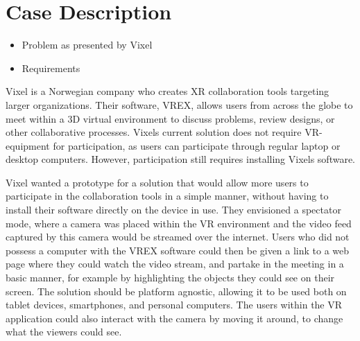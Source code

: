 \section{Case Description}
\begin{itemize}
    \item Problem as presented by Vixel
    \item Requirements 
\end{itemize}

Vixel\cite{vixel} is a Norwegian company who creates XR collaboration tools targeting larger organizations. Their software, VREX\cite{vrex}, allows users from across the globe to meet within a 3D virtual environment to discuss problems, review designs, or other collaborative processes. Vixels current solution does not require VR-equipment for participation, as users can participate through regular laptop or desktop computers. However, participation still requires installing Vixels software. 

Vixel wanted a prototype for a solution that would allow more users to participate in the collaboration tools in a simple manner, without having to install their software directly on the device in use. They envisioned a spectator mode, where a camera was placed within the VR environment and the video feed captured by this camera would be streamed over the internet.  Users who did not possess a computer with the VREX software could then be given a link to a web page where they could watch the video stream, and partake in the meeting in a basic manner, for example by highlighting the objects they could see on their screen. The solution should be platform agnostic, allowing it to be used both on tablet devices, smartphones, and personal computers. The users within the VR application could also interact with the camera by moving it around, to change what the viewers could see.

